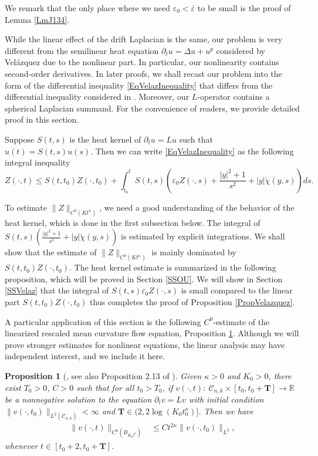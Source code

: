 \documentclass[11pt]{amsart}
\numberwithin{equation}{section}
\newtheorem{proposition}[theorem]{Proposition}
\numberwithin{equation}{section}
\newcommand{\eps}{\varepsilon}
\newcommand{\cC}{\mathcal{C}}
\newcommand{\R}{\mathbb{R}}
\newcommand{\pr}{\partial}
\begin{document}
	
	We remark that the only place where we need $\eps_0<\bar\eps$ to be small is the proof of Lemma \ref{LmJ134}.
	
	While the linear effect of the drift Laplacian is the same, our problem is very different from the semilinear heat equation $\partial_t u=\Delta u+u^p$ considered by Vel\'azquez due to the nonlinear part. In particular, our nonlinearity contains second-order derivatives. In later proofs, we shall recast our problem into the form of the differential inequality \eqref{EqVelazInequality} that differs from the differential inequality considered in \cite{V1}. Moreover, our $L$-operator contains a spherical Laplacian summand. For the convenience of readers, we provide detailed proof in this section. 
	
	
	
	Suppose $S(t,s)$ is the heat kernel of $\partial_t u=Lu$ such that $u(t)=S(t,s)u(s)$. Then we can write \eqref{EqVelazInequality} as the following integral inequality
	$$Z(\cdot, t)\leq S(t,t_0)Z(\cdot,t_0)+\int_{t_0}^t S(t,s)\left(\eps_0 Z(\cdot,s)+\frac{|y|^2+1}{s^2}+|y|\check{\chi}(y,s)\right)ds.$$
	
	To estimate $\|Z\|_{C^0(Kt^\kappa)}$, we need a good understanding of the behavior of the heat kernel, which is done in the first subsection below. The integral of $S(t,s)(\frac{|y|^2+1}{s^2}+|y|\check{\chi}(y,s))$ is estimated by explicit integrations. We shall show that the estimate of $\|Z\|_{C^0(Kt^\kappa)}$ is mainly dominated by $S(t,t_0)Z(\cdot,t_0)$. The heat kernel estimate is summarized in the following proposition, which will be proved in Section \ref{SSOU}.  We will show in Section \ref{SSVelaz} that the integral of $S(t,s)\eps_0 Z(\cdot,s)$ is small compared to the linear part $S(t,t_0)Z(\cdot,t_0)$ thus completes the proof of Proposition \ref{PropVelazquez}. 
	
	A particular application of this section is the following $C^0$-estimate of the linearized rescaled mean curvature flow equation, Proposition \ref{PropBoundary-global}. Although we will prove stronger estimates for nonlinear equations, the linear analysis may have independent interest, and we include it here.
	
	\begin{proposition}[\cite{V1}, see also Proposition 2.13 of \cite{KZ}]\label{PropBoundary-global}
		Given $\kappa>0$ and $K_0>0$, there exist $T_0>0$, $C>0$ such that for all $t_0>T_0$, 
		if $v(\cdot,t):\ \cC_{n,k}\times[t_0,t_0+\mathbf{T}]\to \R$ be a nonnegative solution to the equation
		$\pr_tv= Lv$
		with initial condition $\|v(\cdot,t_0)\|_{L^2(\cC_{n,k})}<\infty$ and $\mathbf{T}\in(2,2\log (K_0 t_0^\kappa)]$. 
		Then we have
		\begin{equation*}
			\begin{aligned}
				\|v(\cdot,t)\|_{C^0(B_{K_0t^{\kappa}})}
				&\leq C t^{2\kappa}\|v(\cdot,t_0)\|_{L^2},
			\end{aligned}
		\end{equation*}
		whenever $t\in[t_0+2,t_0+\mathbf T]$.
	\end{proposition}
\end{document}

